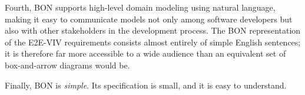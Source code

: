 \documentclass[]{report}
\begin{document}
Fourth, BON supports high-level domain modeling using natural
language, making it easy to communicate models not only among software
developers but also with other stakeholders in the development
process. The BON representation of the E2E-VIV requirements consists
almost entirely of simple English sentences; it is therefore far more
accessible to a wide audience than an equivalent set of box-and-arrow
diagrams would be.

Finally, BON is \emph{simple}. Its specification is small, and it is
easy to understand.

\end{document}
